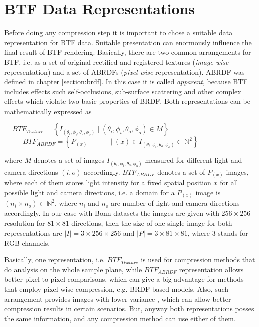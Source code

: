 \chapter{BTF Data Representations}
\label{chapter:representations}




Before doing any compression step it is important to chose a suitable data representation for BTF data.
Suitable presentation can enormously influence the final result of BTF rendering.
 Basically, there are two common arrangements for BTF, i.e. as a set of original rectified and registered textures (\emph{image-wise} representation) and a set of ABRDFs (\emph{pixel-wise} representation).
 ABRDF was defined in chapter \ref{section:brdf}. In this case it is called \emph{apparent},
 because BTF includes effects such self-occlusions, sub-surface scattering and other complex effects which violate two basic properties of BRDF.
Both representations can be mathematically expressed as

{\centering $\,\,\,\,\,\,\,BTF_{Texture}=\left \{I_{(\theta_{i} ,\phi_{i},\theta_{o} ,\phi_{o}) }  \mid  (\theta_{i},\phi_{i},\theta_{o} ,\phi_{o})\in M \right \}$\\}
{\centering $\,\,\,\,\,\,\,\,\,\,\,\,\,\,\,\,BTF_{ABRDF}=\left \{P_{(x) } \,\,\,\,\,\,\,\,\,\,\,\,\,\,\,\,\,\,\mid  (x)\in I_{(\theta_{i} ,\phi_{i},\theta_{o} ,\phi_{o})}\subset \mathbb{N}^{2}\right \}$ \\}


where $M$ denotes a set of images $I_{(\theta_{i} ,\phi_{i},\theta_{o} ,\phi_{o})}$ measured for different light and camera directions $(i,o)$ accordingly.
$BTF_{ABRDF}$ denotes a set of $P_{(x)}$ images, where each of them stores light intensity for a fixed spatial position $x$ for all possible light and camera directions, 
i.e. a domain for a $P_{(x)}$ image is $(n_{i}\times n_{o})\subset \mathbb{N}^{2}$, where $n_{i}$ and $n_{o}$ are number of light and camera directions accordingly.
In our case with Bonn datasets the images are given with $256\times256$ resolution for $81\times81$ directions, 
then the size of one single image for both representations are $\left | I \right | = 3\times256\times256$ and $\left | P \right | = 3\times81\times81$, where $3$ stands for RGB channels.

Basically, one representation, i.e. $BTF_{Texture}$ is used for compression methods that do analysis on the whole sample plane, 
while $BTF_{ABRDF}$ representation allows better pixel-to-pixel comparisons, which can give a big advantage for methods that employ pixel-wise compression, e.g. BRDF based models.
Also, such arrangement provides images with lower variance \cite{haindl}, which can allow better compression results in certain scenarios.
But, anyway both representations posses the same information, and any compression method can use either of them.

